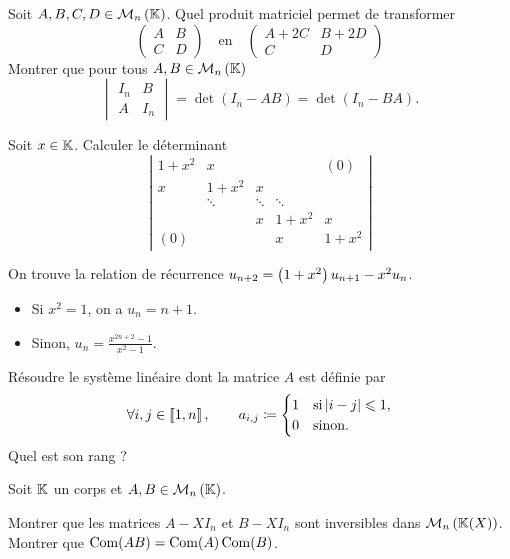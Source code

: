 \documentclass{magnolia}
\begin{document}
\begin{questions}
\question Soit $A,B,C,D\in\mathcal{M}_{n}\left(\mathbb{K}\right)$. Quel produit matriciel permet de transformer
  \[\begin{pmatrix}A & B\\ C&D\end{pmatrix} \quad\text{en}\quad
    \begin{pmatrix}A+2C & B+2D\\ C&D\end{pmatrix}\]
\question Montrer que pour tous $A,B\in\mathcal{M}_{n}\left(\mathbb{K}\right)$
  \[\begin{vmatrix}I_n & B\\A & I_n\end{vmatrix} = \det(I_n - AB)=\det(I_n-BA).\]
\end{questions}



Soit $x\in\mathbb{K}$. Calculer le déterminant
\[\left|
\begin{array}{ccccc}
1+x^2 & x &  & & (0)\\
x & 1+x^2 & x & & \\
  & \ddots & \ddots & \ddots & \\
  &   & x & 1+x^2 & x\\
(0)  & &  & x & 1+x^2
\end{array}
\right|\]
\begin{sol}
On trouve la relation de récurrence $u_{n+2}=\left(1+x^2\right)u_{n+1}-x^2 u_n$.\begin{itemize}
\item Si $x^2=1$, on a $u_n=n+1$.
\item Sinon, $u_n=\frac{x^{2n+2}-1}{x^2-1}$.
\end{itemize}
\end{sol}



Résoudre le système linéaire dont la matrice $A$ est définie par
\[\forall i,j\in\left\llbracket 1,n\right\rrbracket,\quad \quad a_{i,j}\coloneqq
  \begin{cases}
  1 & \text{si} \left|i-j\right|\leqslant 1,\\
  0 & \text{sinon.}
  \end{cases}\]
Quel est son rang ?





Soit $\mathbb{K}$ un corps et $A,B\in\mathcal{M}_{n}\left(\mathbb{K}\right)$.
\begin{questions}
\question Montrer que les matrices $A-X I_n$ et $B-XI_n$ sont inversibles dans
  $\mat{n}{\fracK}$.
\question Montrer que $\mathop{\rm Com}(AB)=\mathop{\rm Com}(A)\mathop{\rm Com}(B)$.
\end{questions}
\end{document}

